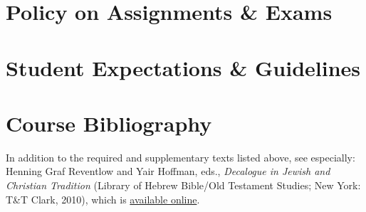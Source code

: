 \documentclass[titlepage]{article}
\newcommand\policy{../policy}
\begin{document}


\section{Policy on Assignments \& Exams}
\label{policy}





\section{Student Expectations \& Guidelines}
\label{expectations}







\section{Course Bibliography}
\label{bibliography}

In addition to the required and supplementary texts listed above, see
especially: Henning Graf Reventlow and Yair Hoffman, eds.,
\emph{Decalogue in Jewish and Christian Tradition} (Library of Hebrew
Bible/Old Testament Studies; New York: T\&T Clark, 2010), which is
\href{http://ezproxy.mytyndale.ca:2048/login?url=http://search.ebscohost.com/login.aspx?direct=true&db=e000xna&AN=369752&site=ehost-live&scope=site}{available online}.
\end{document}
